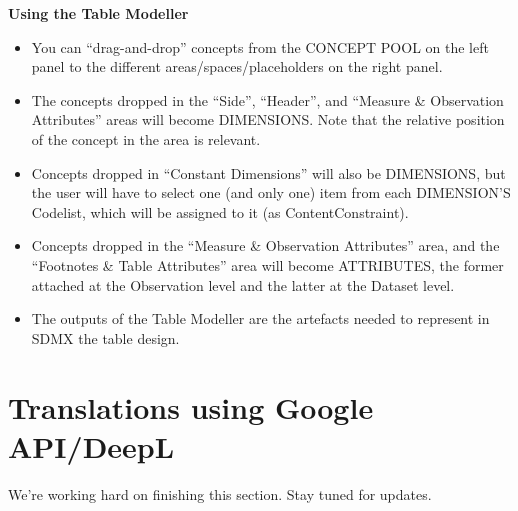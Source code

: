 \documentclass[
]{book}
\begin{document}
\textbf{Using the Table Modeller}

\begin{itemize}
\item
  You can ``drag-and-drop'' concepts from the CONCEPT POOL on the left panel to the different areas/spaces/placeholders on the right panel.
\item
  The concepts dropped in the ``Side'', ``Header'', and ``Measure \& Observation Attributes'' areas will become DIMENSIONS. Note that the relative position of the concept in the area is relevant.
\item
  Concepts dropped in ``Constant Dimensions'' will also be DIMENSIONS, but the user will have to select one (and only one) item from each DIMENSION'S Codelist, which will be assigned to it (as ContentConstraint).
\item
  Concepts dropped in the ``Measure \& Observation Attributes'' area, and the ``Footnotes \& Table Attributes'' area will become ATTRIBUTES, the former attached at the Observation level and the latter at the Dataset level.
\item
  The outputs of the Table Modeller are the artefacts needed to represent in SDMX the table design.
\end{itemize}

\hypertarget{translations-using-google-apideepl}{%
\section{Translations using Google API/DeepL}\label{translations-using-google-apideepl}}

We're working hard on finishing this section. Stay tuned for updates.

  
\end{document}
